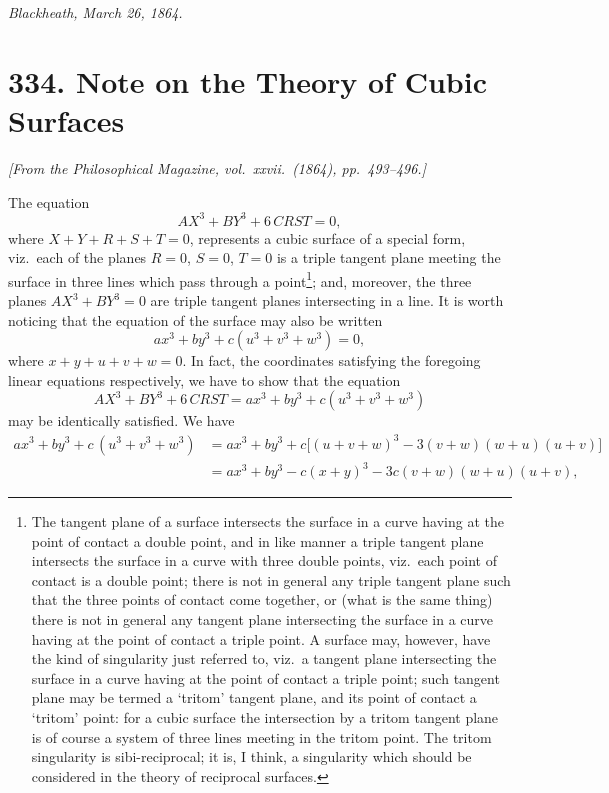 \documentclass[11pt,a4paper]{article}
\theoremstyle{plain}
\begin{document}
\medskip
\noindent\textit{Blackheath, March 26, 1864.}

\newpage
\section*{334. Note on the Theory of Cubic Surfaces}

\noindent\textit{[From the Philosophical Magazine, vol.\ xxvii.\ (1864), pp.\ 493--496.]}

\medskip

The equation
\[
AX^3 + BY^3 + 6\,CRST = 0,
\]
where $X + Y + R + S + T = 0$, represents a cubic surface of a special form, viz.\ each of the planes $R = 0$, $S = 0$, $T = 0$ is a triple tangent plane meeting the surface in three lines which pass through a point\footnote{The tangent plane of a surface intersects the surface in a curve having at the point of contact a double point, and in like manner a triple tangent plane intersects the surface in a curve with three double points, viz.\ each point of contact is a double point; there is not in general any triple tangent plane such that the three points of contact come together, or (what is the same thing) there is not in general any tangent plane intersecting the surface in a curve having at the point of contact a triple point. A surface may, however, have the kind of singularity just referred to, viz.\ a tangent plane intersecting the surface in a curve having at the point of contact a triple point; such tangent plane may be termed a `tritom' tangent plane, and its point of contact a `tritom' point: for a cubic surface the intersection by a tritom tangent plane is of course a system of three lines meeting in the tritom point. The tritom singularity is sibi-reciprocal; it is, I think, a singularity which should be considered in the theory of reciprocal surfaces.}; and, moreover, the three planes $AX^3 + BY^3 = 0$ are triple tangent planes intersecting in a line. It is worth noticing that the equation of the surface may also be written
\[
a x^3 + b y^3 + c(u^3 + v^3 + w^3) = 0,
\]
where $x + y + u + v + w = 0$. In fact, the coordinates satisfying the foregoing linear equations respectively, we have to show that the equation
\[
AX^3 + BY^3 + 6\,CRST = a x^3 + b y^3 + c(u^3 + v^3 + w^3)
\]
may be identically satisfied. We have
\begin{align*}
a x^3 + b y^3 + c\,(u^3 + v^3 + w^3)
 &= a x^3 + b y^3 + c\bigl[(u + v + w)^3 - 3(v + w)(w + u)(u + v)\bigr]\\
 &= a x^3 + b y^3 - c(x + y)^3 - 3c(v + w)(w + u)(u + v),
\end{align*}
\end{document}

